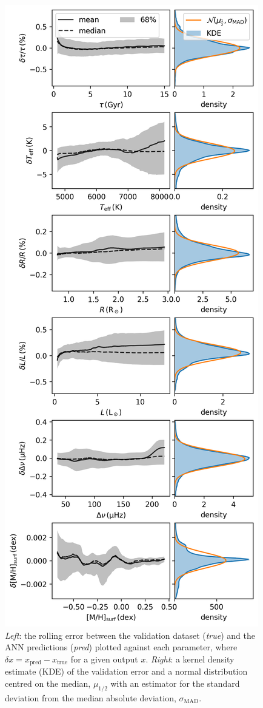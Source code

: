 \documentclass[a4paper,fleqn,usenatbib]{mnras}
\begin{document}
\begin{figure}
    \centering
    \includegraphics[width=\linewidth]{figures/validation.png}
    \caption{\emph{Left}: the rolling error between the validation dataset (\emph{true}) and the ANN predictions (\emph{pred}) plotted against each parameter, where $\delta x = x_\mathrm{pred} - x_\mathrm{true}$ for a given output $x$. \emph{Right}: a kernel density estimate (KDE) of the validation error and a normal distribution centred on the median, $\mu_{1/2}$ with an estimator for the standard deviation from the median absolute deviation, $\sigma_\mathrm{MAD}$.}
    \label{fig:validation}
\end{figure}
\end{document}
